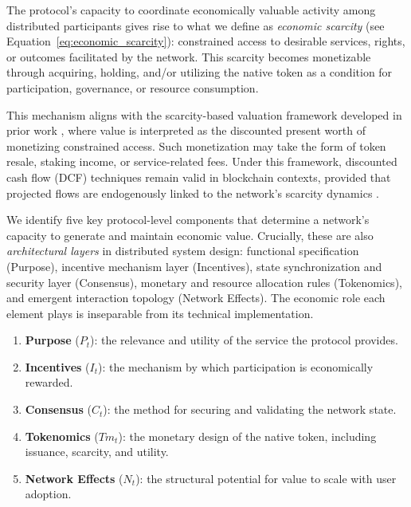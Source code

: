 \documentclass[12pt]{article}
\begin{document}
The protocol’s capacity to coordinate economically valuable activity among distributed participants gives rise to what we define as \textit{economic scarcity} (see Equation~\ref{eq:economic_scarcity}): constrained access to desirable services, rights, or outcomes facilitated by the network. This scarcity becomes monetizable through acquiring, holding, and/or utilizing the native token as a condition for participation, governance, or resource consumption.

This mechanism aligns with the scarcity-based valuation framework developed in prior work \citep{papadogiannis2025scarcity}, where value is interpreted as the discounted present worth of monetizing constrained access. Such monetization may take the form of token resale, staking income, or service-related fees. Under this framework, discounted cash flow (DCF) techniques remain valid in blockchain contexts, provided that projected flows are endogenously linked to the network’s scarcity dynamics \citep{papadogiannis2025dualrisk}.

We identify five key protocol-level components that determine a network's capacity to generate and maintain economic value. Crucially, these are also \textit{architectural layers} in distributed system design: functional specification (Purpose), incentive mechanism layer (Incentives), state synchronization and security layer (Consensus), monetary and resource allocation rules (Tokenomics), and emergent interaction topology (Network Effects). The economic role each element plays is inseparable from its technical implementation.

\begin{tcolorbox}[title=\textbf{The Five Elements of Blockchain Value}]
\begin{enumerate}
    \item \textbf{Purpose} (\(P_t\)): the relevance and utility of the service the protocol provides.
    \item \textbf{Incentives} (\(I_t\)): the mechanism by which participation is economically rewarded.
    \item \textbf{Consensus} (\(C_t\)): the method for securing and validating the network state.
    \item \textbf{Tokenomics} (\(Tm_t\)): the monetary design of the native token, including issuance, scarcity, and utility.
    \item \textbf{Network Effects} (\(N_t\)): the structural potential for value to scale with user adoption.
\end{enumerate}
\end{tcolorbox}
\end{document}
